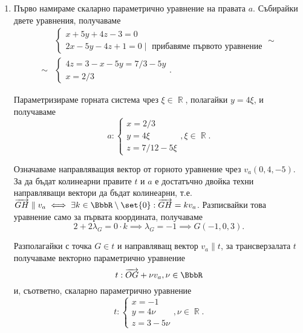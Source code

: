 \documentclass{../../common/topic}
\begin{document}
\begin{solution}
\begin{enumerate}[label=\alph*)]
    \item Първо намираме скаларно параметрично уравнение на правата \( a \). Събирайки двете уравнения, получаваме
    \begin{align*}
      &\begin{cases}
        x + 5y + 4z - 3 = 0 \\
        2x - 5y - 4z + 1 = 0 \mid \text{ прибавяме първото уравнение}
      \end{cases}
      \sim \\ \sim
      &\begin{cases}
        4z = 3 - x - 5y = 7 / 3 - 5y \\
        x = 2 / 3
      \end{cases}.
    \end{align*}

    Параметризираме горната система чрез \( \xi \in \BbbR \), полагайки \( y = 4\xi \), и получаваме
    \begin{equation*}
      a: \begin{cases}
        x = 2 / 3 \\
        y = 4\xi \\
        z = 7/{12} - 5\xi
      \end{cases},
      \xi \in \BbbR.
    \end{equation*}

    Означаваме направляващия вектор от горното уравнение чрез \( v_a(0, 4, -5) \). За да бъдат колинеарни правите \( t \) и \( a \) е достатъчно двойка техни направляващи вектори да бъдат колинеарни, т.е. \( \vect{GH} \parallel v_a \iff \exists k \in \BbbR \setminus \set{ 0 } : \vect{GH} = k v_a \). Разписвайки това уравнение само за първата координата, получаваме
    \begin{equation*}
      2 + 2\lambda_G = 0 \cdot k \implies \lambda_G = -1 \implies G(-1, 0, 3).
    \end{equation*}

    Разполагайки с точка \( G \in t \) и направляващ вектор \( v_a \parallel t \), за трансверзалата \( t \) получаваме векторно параметрично уравнение
    \begin{equation*}
      t: \vect{OG} + \nu v_a, \nu \in \BbbR
    \end{equation*}
    и, съответно, скаларно параметрично уравнение
    \begin{equation*}
      t: \begin{cases}
        x = -1 \\
        y = 4\nu \\
        z = 3 - 5\nu
      \end{cases},
      \nu \in \BbbR.
    \end{equation*}
  \end{enumerate}
\end{solution}
\end{document}
